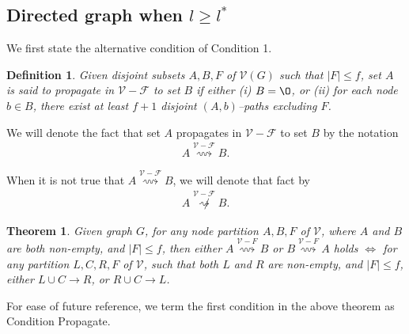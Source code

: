 \documentclass[letterpaper, 11pt]{article}
\newtheorem{definition}{Definition}[section]
\newtheorem{theorem}{Theorem}[section]
\newcommand{\calF}{{\mathcal{F}}}
\newcommand{\calV}{{\mathcal{V}}}
\begin{document}
\subsection{Directed graph when $l\ge l^*$}

We first state the alternative condition of Condition 1.
\begin{definition}
Given disjoint subsets $A, B, F$ of $\calV(G)$ such that $|F|\le f$, set $A$ is said to propagate in $\calV-\calF$ to set $B$ if either (i) $B=\O$, or (ii) for each node $b\in B$, there exist at least $f+1$ disjoint $(A, b)$--paths excluding $F$.
\end{definition}

We will denote the fact that set $A$ propagates in $\calV-\calF$ to set $B$ by the notation
\begin{align*}
A\overset{\calV-\calF}{\rightsquigarrow}B.
\end{align*}

When it is not true that $A\overset{\calV-\calF}{\rightsquigarrow}B$, we will denote that fact by
\begin{align*}
A\overset{\calV-\calF}{\not\rightsquigarrow}B.
\end{align*}










\begin{theorem}
Given graph $G$, for any node partition $A, B, F$ of $\calV$, where $A$ and $B$ are both non-empty, and $|F|\le f$, then either $A\overset{\calV-F}{\rightsquigarrow}B$ or $B\overset{\calV-F}{\rightsquigarrow}A$ holds $\iff$ for any partition $L, C, R, F$ of $\calV$, such that both $L$ and $R$ are non-empty, and $|F|\le f$, either $L\cup C\to R$, or $R\cup C\to L$.
\end{theorem}

For ease of future reference, we term the first condition in the above theorem as Condition Propagate.
\end{document}
